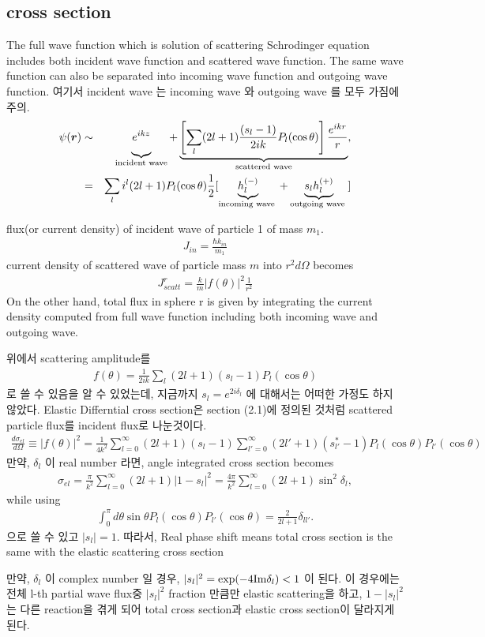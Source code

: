 \documentclass[10pt]{book}
\def\bm{\boldsymbol}
\newcommand{\bea}{\begin{eqnarray}}
\newcommand{\eea}{\end{eqnarray}}
\newcommand{\no}{\nonumber \\}
\def\vr{{\bm r}}
\begin{document}
\subsection{cross section}
The full wave function which is solution of scattering Schrodinger equation
includes both incident wave function and scattered wave function. The same wave function 
can also be separated into incoming wave function and outgoing wave function.
여기서 incident wave 는 incoming wave 와 outgoing wave 를 모두 가짐에 주의. 
\bea 
\psi(\vr)&\sim& \underbrace{\vphantom{ \left[\frac{e^{ikr}}{r}\right] }
  e^{ikz} }_{\text{incident wave}}
 +\underbrace{ \left[\sum_l(2l+1)\frac{(s_l-1)}{2ik} P_l(\cos\theta)\right]\frac{e^{ikr}}{r}
 }_{\text{scattered wave}},\no 
 &=&\sum_l i^l (2l+1) P_l(\cos\theta)\frac{1}{2}[
   \underbrace{h_l^{(-)} }_{\text{incoming wave }}
   +\underbrace{ s_l h_l^{(+)} }_{\text{outgoing wave }}] 
\eea  

flux(or current density) of incident wave of particle 1 of mass $m_1$. 
\bea 
J_{in}=\frac{\hbar k_{in}}{m_1}
\eea 
current density of scattered wave of particle mass $m$ into $r^2 d\Omega$ becomes
\bea 
J^r_{scatt}=\frac{k}{m}|f(\theta)|^2 \frac{1}{r^2}
\eea 
On the other hand, total flux in sphere r is given by integrating 
the current density computed from full wave function including both incoming wave and 
outgoing wave.

위에서 scattering amplitude를 
\bea
f(\theta)=\frac{1}{2ik}\sum_l (2l+1)(s_l-1)P_l(\cos\theta)
\eea
로 쓸 수 있음을 알 수 있었는데, 지금까지 $s_l=e^{2i\delta_l}$ 에 
대해서는 어떠한 가정도 하지 않았다. 
Elastic Differntial cross section은 section (2.1)에 정의된
것처럼 scattered particle flux를 incident flux로 나눈것이다.
\bea
\frac{d\sigma_{el}}{d\Omega}\equiv |f(\theta)|^2=
 \frac{1}{4k^2}
 \sum_{l=0}^\infty(2l+1)(s_l-1)
 \sum_{l'=0}^\infty (2l'+1)(s^*_{l'}-1)
 P_{l}(\cos\theta) P_{l'}(\cos\theta)
\eea
만약, $\delta_l$ 이 real number 라면, angle integrated cross section becomes
\bea
\sigma_{el}
=\frac{\pi}{k^2}\sum_{l=0}^\infty(2l+1)|1-s_l|^2
=\frac{4\pi}{k^2}\sum_{l=0}^\infty (2l+1)\sin^2\delta_l
,
\eea 
while using
\bea
\int_0^\pi d\theta\sin\theta 
 P_l(\cos\theta) P_{l'}(\cos\theta)=\frac{2}{2l+1}\delta_{ll'}.
\eea
으로 쓸 수 있고 $|s_l|=1$. 따라서, Real phase shift means
total cross section is the same with the
elastic scattering cross section

만약, $\delta_l$ 이 complex number 일 경우, 
$|s_l|^2=\exp(-4{\rm Im}\delta_l)<1$ 이 된다. 
이 경우에는 전체 l-th partial wave flux중 $|s_l|^2$ fraction
만큼만 elastic scattering을 하고, $1-|s_l|^2$ 는 
다른 reaction을 겪게 되어 
total cross section과 elastic cross section이 달라지게 된다. 
\end{document}

